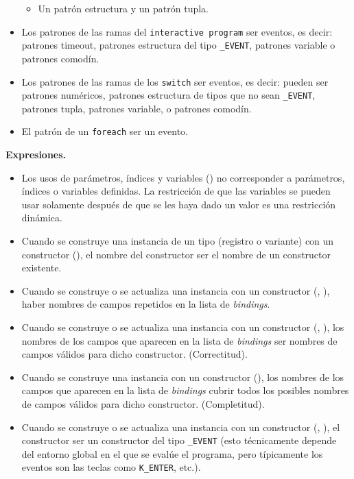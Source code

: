 \documentclass{article}
\begin{document}
\begin{itemize}
\begin{itemize}
      \item Un patr\'on estructura y un patr\'on tupla.
      \end{itemize}
\item Los patrones de las ramas del \texttt{interactive program}
      \DEBEN ser eventos, es decir:
      patrones timeout,
      patrones estructura del tipo \texttt{\_EVENT},
      patrones variable
      o patrones comod\'in.
\item Los patrones de las ramas de los \texttt{switch} \NOPUEDEN ser eventos, es decir:
      pueden ser
      patrones num\'ericos,
      patrones estructura de tipos que no sean \texttt{\_EVENT},
      patrones tupla,
      patrones variable,
      o patrones comod\'in.
\item El patr\'on de un \texttt{foreach} \NOPUEDE ser un evento. 
\end{itemize}

{\bf Expresiones.}
\begin{itemize}
\item Los usos de par\'ametros, \'indices y variables () \PUEDEN no corresponder a par\'ametros, \'indices o variables definidas.
      La restricci\'on de que las variables se pueden usar solamente despu\'es de que se les haya dado un valor es una restricci\'on din\'amica.
\item Cuando se construye una instancia de un tipo (registro o variante) con un constructor (),
      el nombre del constructor \DEBE ser el nombre de un constructor existente.
\item Cuando se construye o se actualiza una instancia con un constructor (, ),
      \NOPUEDE haber nombres de campos repetidos en la lista de {\em bindings}.
\item Cuando se construye o se actualiza una instancia con un constructor (, ),
      los nombres de los campos que aparecen en la lista de {\em bindings}
      \DEBEN ser nombres de campos v\'alidos para dicho constructor. (Correctitud).
\item Cuando se construye una instancia con un constructor (),
      los nombres de los campos que aparecen en la lista de {\em bindings}
      \DEBEN cubrir todos los posibles nombres de campos v\'alidos para dicho constructor. (Completitud).
\item Cuando se construye o se actualiza una instancia con un constructor (, ),
      el constructor \NOPUEDE ser un constructor del tipo \texttt{\_EVENT} (esto t\'ecnicamente depende
      del entorno global en el que se eval\'ue el programa, pero t\'ipicamente
      los eventos son las teclas como \texttt{K\_ENTER}, etc.).
\end{itemize}
\end{document}
